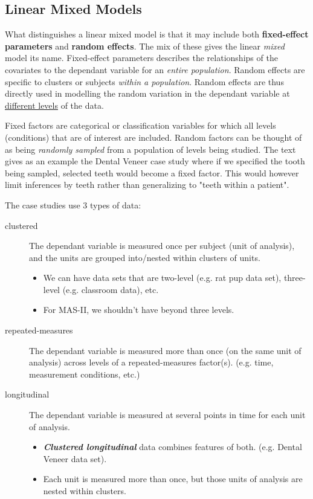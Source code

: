 \documentclass[english]{article}
\begin{document}
\begin{multicols*}{2}
\newpage
\part{Linear Mixed Models}\label{part:LMM}
\begin{rappel_enhanced}[Context]
What distinguishes a linear mixed model is that it may include both \textbf{fixed-effect parameters} and \textbf{random effects}. The mix of these gives the linear \textit{mixed} model its name. Fixed-effect parameters describes the relationships of the covariates to the dependant variable for an \textit{entire population}. Random effects are specific to clusters or subjects \textit{within a population}. Random effects are thus directly used in modelling the random variation in the dependant variable at \underline{different levels} of the data.

\bigskip

Fixed factors are categorical or classification variables for which all levels (conditions) that are of interest are included. Random factors can be thought of as being \textit{randomly sampled} from a population of levels being studied. The text gives as an example the Dental Veneer case study where if we specified the tooth being sampled, selected teeth would become a fixed factor. This would however limit inferences by teeth rather than generalizing to "teeth within a patient". 
\end{rappel_enhanced}

The case studies use 3 types of data:
\begin{description}
	\item[clustered]	The dependant variable is measured once per subject (unit of analysis), and the units are grouped into/nested within clusters of units. 
		\begin{itemize}
		\item	We can have data sets that are two-level (e.g. rat pup data set), three-level (e.g. classroom data), etc.
		\item	For MAS-II, we shouldn't have beyond three levels.
		\end{itemize}
	\item[repeated-measures]	The dependant variable is measured more than once (on the same unit of analysis) across levels of a repeated-measures factor(s). (e.g. time, measurement conditions, etc.)
	\item[longitudinal]	The dependant variable is measured at several points in time for each unit of analysis.
		\begin{itemize}
		\item	\textit{\textbf{Clustered longitudinal}} data combines features of both. (e.g. Dental Veneer data set).
		\item	Each unit is measured more than once, but those units of analysis are nested within clusters.
		\end{itemize}
\end{description}



\end{multicols*}
\end{document}
